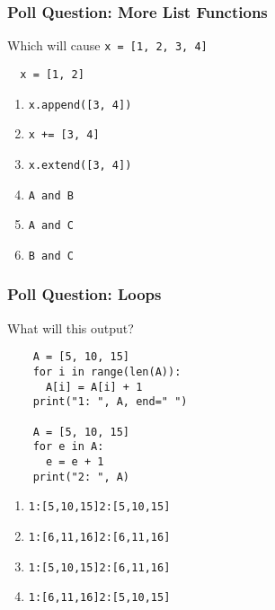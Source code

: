 \documentclass{beamer}
\begin{document}
%
%
\begin{frame}[fragile]
  \frametitle{Poll Question: More List Functions}
  Which will cause \lstinline|x = [1, 2, 3, 4]|
  \begin{lstlisting}
  x = [1, 2]
  \end{lstlisting}
  \vfill
  \begin{enumerate}[A]
    \item \lstinline|x.append([3, 4])|
    \item \lstinline|x += [3, 4]|
    \item \lstinline|x.extend([3, 4])|
    \item \lstinline|A and B|
    \item \lstinline|A and C|
    \item \lstinline|B and C|
  \end{enumerate}
\end{frame}

%
%
\begin{frame}[fragile]
  \frametitle{Poll Question: Loops}
  What will this output?\\
  \begin{minipage}{0.48\textwidth}
    \begin{lstlisting}
    A = [5, 10, 15]
    for i in range(len(A)):
      A[i] = A[i] + 1
    print("1: ", A, end=" ")

    A = [5, 10, 15]
    for e in A:
      e = e + 1
    print("2: ", A)
    \end{lstlisting}
  \end{minipage}
  \hfill
  \begin{minipage}{0.48\textwidth}
    \begin{enumerate}[A]
      \item \lstinline|1:[5,10,15]2:[5,10,15]|
      \item \lstinline|1:[6,11,16]2:[6,11,16]|
      \item \lstinline|1:[5,10,15]2:[6,11,16]|
      \item \lstinline|1:[6,11,16]2:[5,10,15]|
    \end{enumerate}
  \end{minipage}
\end{frame}
\end{document}
